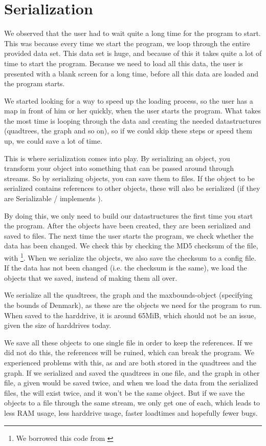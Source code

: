 \section{Serialization}
\label{IMPL-SERI}
We observed that the user had to wait quite a long time for the program to
start. This was because every time we start the program, we loop through the
entire provided data set. This data set is huge, and because of this it takes
quite a lot of time to start the program. Because we need to load all this data,
the user is presented with a blank screen for a long time, before all this data
are loaded and the program starts.

We started looking for a way to speed up the loading process, so the user has a
map in front of him or her quickly, when the user starts the program. What takes
the most time is looping through the data and creating the needed datastructures
(quadtrees, the graph and so on), so if we could skip these steps or speed them
up, we could save a lot of time.

This is where serialization comes into play. By serializing an object, you
transform your object into something that can be passed around through streams.
So by serializing objects, you can save them to files. If the object to be
serialized contains references to other objects, these will also be serialized
(if they are Serializable / implements ).

By doing this, we only need to build our datastructures the first time you start
the program. After the objects have been created, they are been serialized and
saved to files. The next time the user starts the program, we check whether the
data has been changed. We check this by checking the MD5 checksum of the file,
with \footnote{We borrowed this code from \cite{MD5}}. When
we serialize the objects, we also save the checksum to a config file. If the
data has not been changed (i.e. the checksum is the same), we load the objects
that we saved, instead of making them all over. 

We serialize all the quadtrees, the graph and the maxbounds-object (specifying
the bounds of Denmark), as these are the objects we need for the program to run.
When saved to the harddrive, it is around 65MiB, which should not be an issue,
given the size of harddrives today. 

We save all these objects to one single file in order to keep the references. If
we did not do this, the references will be ruined, which can break the program.
We experienced problems with this, as  and  are both
stored in the quadtrees and the graph. If we serialized and saved the quadtrees
in one file, and the graph in other file, a given  would be saved
twice, and when we load the data from the serialized files, the 
will exist twice, and it won't be the same object. But if we save the objects to
a file through the same stream, we only get one of each, which leads to less RAM
usage, less harddrive usage, faster loadtimes and hopefully fewer bugs.

